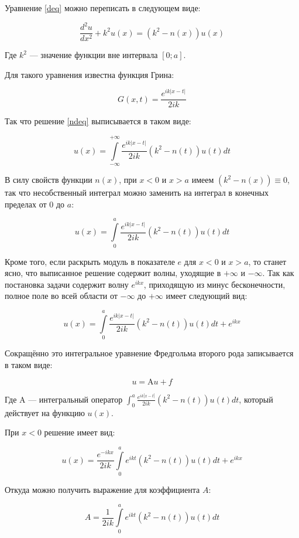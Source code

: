 \documentclass{article}
\providecommand{\abs}[1]{\left \lvert{#1}\right \rvert}
\providecommand{\op}[1]{\mathrm{#1}}
\numberwithin{equation}{section}
\begin{document}
Уравнение \eqref{deq} можно переписать в следующем виде:

\begin{equation}\label{ndeq}
\frac{d^2u}{dx^2} + k^2 u(x) = (k^2 - n(x)) u(x)
\end{equation}

Где $k^2$ — значение функции вне интервала $[0; a]$.

Для такого уравнения известна функция Грина:

\[
G(x, t) = \frac{e^{ik\abs{x-t}}}{2ik}
\]

Так что решение \eqref{ndeq} выписывается в таком виде:

\[
u(x) = \int \limits_{-\infty}^{+\infty} {\frac{e^{ik\abs{x-t}}}{2ik} (k^2-n(t))
  u(t) dt}
\]

В силу свойств функции $n(x)$, при $x < 0$ и $x > a$ имеем $(k^2 -
n(x)) \equiv 0$, так что несобственный интеграл можно заменить на
интеграл в конечных пределах от $0$ до $a$:

\[
u(x) = \int \limits_{0}^{a} {\frac{e^{ik\abs{x-t}}}{2ik} (k^2-n(t))
  u(t) dt}
\]

Кроме того, если раскрыть модуль в показателе $e$ для $x<0$ и $x>a$,
то станет ясно, что выписанное решение содержит волны, уходящие в
$+\infty$ и $-\infty$. Так как постановка задачи содержит волну
$e^{ikx}$, приходящую из минус бесконечности, полное поле во всей
области от $-\infty$ до $+\infty$ имеет следующий вид:

\begin{equation}\label{inteq}
u(x) =  \int \limits_{0}^{a} {\frac{e^{ik\abs{x-t}}}{2ik} (k^2-n(t))
  u(t) dt} + e^{ikx}
\end{equation}

Сокращённо это интегральное уравнение Фредгольма второго рода
записывается в таком виде:

\begin{equation}\label{inteq-short}
u = \op{A}u + f
\end{equation}

Где $\op{A}$ — интегральный оператор $\int_{0}^{a}
{\frac{e^{ik\abs{x-t}}}{2ik} (k^2-n(t)) u(t) dt}$, который действует на
функцию $u(x)$.

При $x < 0$ решение имеет вид:

\[
u(x) = \frac{e^{-ikx}}{2ik} \int \limits_{0}^{a} {e^{ikt} (k^2-n(t))
  u(t) dt} + e^{ikx}
\]

Откуда можно получить выражение для коэффициента $A$:

\begin{equation}\label{int-A}
  A = \frac{1}{2ik} \int \limits_{0}^{a} {e^{ikt} (k^2-n(t)) u(t) dt}
\end{equation}
\end{document}
